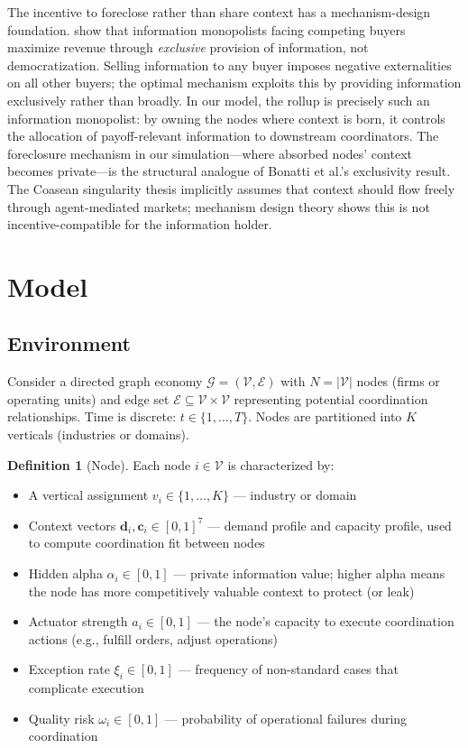 \documentclass[12pt]{article}
\theoremstyle{definition}
\newtheorem{definition}{Definition}
\begin{document}
The incentive to foreclose rather than share context has a mechanism-design foundation. \citet{bonatti2022} show that information monopolists facing competing buyers maximize revenue through \textit{exclusive} provision of information, not democratization. Selling information to any buyer imposes negative externalities on all other buyers; the optimal mechanism exploits this by providing information exclusively rather than broadly. In our model, the rollup is precisely such an information monopolist: by owning the nodes where context is born, it controls the allocation of payoff-relevant information to downstream coordinators. The foreclosure mechanism in our simulation---where absorbed nodes' context becomes private---is the structural analogue of Bonatti et al.'s exclusivity result. The Coasean singularity thesis implicitly assumes that context should flow freely through agent-mediated markets; mechanism design theory shows this is not incentive-compatible for the information holder.

\section{Model}

\subsection{Environment}

Consider a directed graph economy $\mathcal{G} = (\mathcal{V}, \mathcal{E})$ with $N = |\mathcal{V}|$ nodes (firms or operating units) and edge set $\mathcal{E} \subseteq \mathcal{V} \times \mathcal{V}$ representing potential coordination relationships. Time is discrete: $t \in \{1, \ldots, T\}$. Nodes are partitioned into $K$ verticals (industries or domains).

\begin{definition}[Node]
Each node $i \in \mathcal{V}$ is characterized by:
\begin{itemize}
\item A vertical assignment $v_i \in \{1, \ldots, K\}$ --- industry or domain
\item Context vectors $\mathbf{d}_i, \mathbf{c}_i \in [0,1]^7$ --- demand profile and capacity profile, used to compute coordination fit between nodes
\item Hidden alpha $\alpha_i \in [0,1]$ --- private information value; higher alpha means the node has more competitively valuable context to protect (or leak)
\item Actuator strength $a_i \in [0,1]$ --- the node's capacity to execute coordination actions (e.g., fulfill orders, adjust operations)
\item Exception rate $\xi_i \in [0,1]$ --- frequency of non-standard cases that complicate execution
\item Quality risk $\omega_i \in [0,1]$ --- probability of operational failures during coordination
\end{itemize}
\end{definition}
\end{document}
